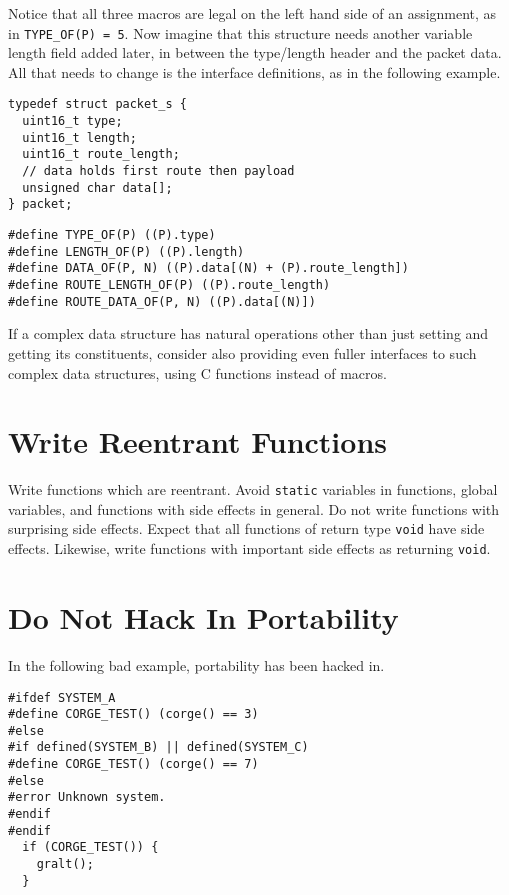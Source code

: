 \documentclass{lulu}
\newcommand{\code}[1]{\texttt{#1}\xspace}
\begin{document}
Notice that all three macros are legal on the left hand side of an
assignment, as in \code{TYPE\_OF(P) = 5}.  Now imagine that this
structure needs another variable length field added later, in between
the type/length header and the packet data.  All that needs to change
is the interface definitions, as in the following example.

\begin{samepage}
\begin{verbatim}
typedef struct packet_s {
  uint16_t type;
  uint16_t length;
  uint16_t route_length;
  // data holds first route then payload
  unsigned char data[]; 
} packet;
\end{verbatim}
\end{samepage}
\begin{samepage}
\begin{verbatim}
#define TYPE_OF(P) ((P).type)
#define LENGTH_OF(P) ((P).length)
#define DATA_OF(P, N) ((P).data[(N) + (P).route_length])
#define ROUTE_LENGTH_OF(P) ((P).route_length)
#define ROUTE_DATA_OF(P, N) ((P).data[(N)])
\end{verbatim}
\end{samepage}

If a complex data structure has natural operations other than just
setting and getting its constituents, consider also providing even
fuller interfaces to such complex data structures, using C functions
instead of macros.

\section{Write Reentrant Functions}

Write functions which are reentrant.  Avoid \code{static} variables in
functions, global variables, and functions with side effects in
general.  Do not write functions with surprising side effects.  Expect
that all functions of return type \code{void} have side effects.
Likewise, write functions with important side effects as returning
\code{void}.

\section{Do Not Hack In Portability}

In the following bad example, portability has been hacked in.

\begin{samepage}
\begin{verbatim}
#ifdef SYSTEM_A
#define CORGE_TEST() (corge() == 3)
#else
#if defined(SYSTEM_B) || defined(SYSTEM_C)
#define CORGE_TEST() (corge() == 7)
#else
#error Unknown system.
#endif
#endif
  if (CORGE_TEST()) {
    gralt();
  }
\end{verbatim}
\end{samepage}
\end{document}
